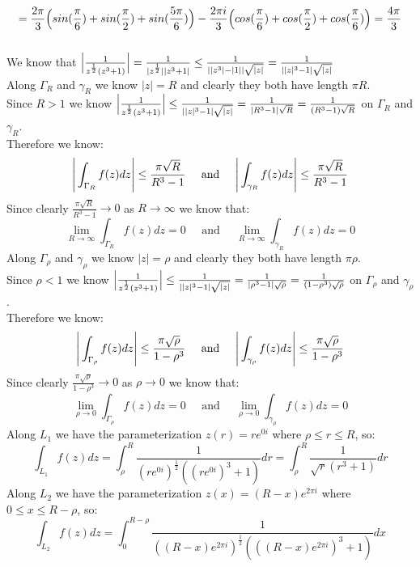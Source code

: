 \documentclass{article}
\begin{document}
\begin{center}
    \[=\frac{2\pi}{3}\Big{(}sin(\frac{\pi}{6}) + sin(\frac{\pi}{2}) + sin(\frac{5\pi}{6})\Big{)} -\frac{2\pi i}{3}\Big{(}cos(\frac{\pi}{6}) + cos(\frac{\pi}{2}) + cos(\frac{\pi}{6})\Big{)} =\frac{4\pi}{3}\]
    \\We know that $\Big{|}\frac{1}{z^{\frac{1}{2}}(z^3 + 1)}\Big{|} =\frac{1}{|z^\frac{1}{2}||z^3 + 1|}\leq\frac{1}{||z^3| - |1||\sqrt{|z|}} =\frac{1}{||z|^3 - 1|\sqrt{|z|}}$
    \\Along $\Gamma _R$ and $\gamma _R$ we know $|z| = R$ and clearly they both have length $\pi R$.
    \\Since $R > 1$ we know $\Big{|}\frac{1}{z^{\frac{1}{2}}(z^3 + 1)}\Big{|}\leq\frac{1}{||z|^3 - 1|\sqrt{|z|}} =\frac{1}{|R^3 - 1|\sqrt{R}} =\frac{1}{(R^3 - 1)\sqrt{R}}$ on $\Gamma _R$ and $\gamma _R$.
    \\Therefore we know:
    \[\Bigg{|}\int _{\Gamma _R} f(z) dz\Bigg{|}\leq\frac{\pi\sqrt{R}}{R^3 - 1}\;\;\;\;\;\text{and}\;\;\;\;\;\Bigg{|}\int _{\gamma _R} f(z) dz\Bigg{|}\leq\frac{\pi\sqrt{R}}{R^3 - 1}\]
    Since clearly $\frac{\pi\sqrt{R}}{R^3 - 1}\rightarrow 0$ as $R\rightarrow\infty$ we know that:
    \[\lim _{R\rightarrow\infty}\int _{\Gamma _R} f(z) dz = 0\;\;\;\;\;\text{and}\;\;\;\;\;\lim _{R\rightarrow\infty}\int _{\gamma _R} f(z) dz = 0\]
    \newpage
    Along $\Gamma _{\rho}$ and $\gamma _{\rho}$ we know $|z| =\rho$ and clearly they both have length $\pi\rho$.
    \\Since $\rho < 1$ we know $\Big{|}\frac{1}{z^{\frac{1}{2}}(z^3 + 1)}\Big{|}\leq\frac{1}{||z|^3 - 1|\sqrt{|z|}} =\frac{1}{|\rho ^3 - 1|\sqrt{\rho}} =\frac{1}{(1 -\rho ^3)\sqrt{\rho}}$ on $\Gamma _{\rho}$ and $\gamma _{\rho}$.
    \\Therefore we know:
    \[\Bigg{|}\int _{\Gamma _{\rho}} f(z) dz\Bigg{|}\leq\frac{\pi\sqrt{\rho}}{1 -\rho ^3}\;\;\;\;\;\text{and}\;\;\;\;\;\Bigg{|}\int _{\gamma _{\rho}} f(z) dz\Bigg{|}\leq\frac{\pi\sqrt{\rho}}{1 -\rho ^3}\]
    Since clearly $\frac{\pi\sqrt{\rho}}{1 -\rho ^3}\rightarrow 0$ as $\rho\rightarrow 0$ we know that:
    \[\lim _{\rho\rightarrow 0}\int _{\Gamma _{\rho}} f(z) dz = 0\;\;\;\;\;\text{and}\;\;\;\;\;\lim _{\rho\rightarrow 0}\int _{\gamma _{\rho}} f(z) dz = 0\]
    Along $L_1$ we have the parameterization $z(r) = re^{0i}$ where $\rho\leq r\leq R$, so:
    \[\int _{L_1} f(z) dz =\int _{\rho}^R\frac{1}{(re^{0i})^{\frac{1}{2}} ((re^{0i})^3 + 1)} dr =\int _{\rho}^R\frac{1}{\sqrt{r}(r^3 + 1)} dr\]
    Along $L_2$ we have the parameterization $z(x) = (R - x)e^{2\pi i}$ where $0\leq x\leq R -\rho$, so:
    \[\int _{L_2} f(z) dz =\int _0^{R-\rho}\frac{1}{((R-x)e^{2\pi i})^{\frac{1}{2}}(((R-x)e^{2\pi i})^3 + 1)} dx\]

\end{center}
\end{document}
